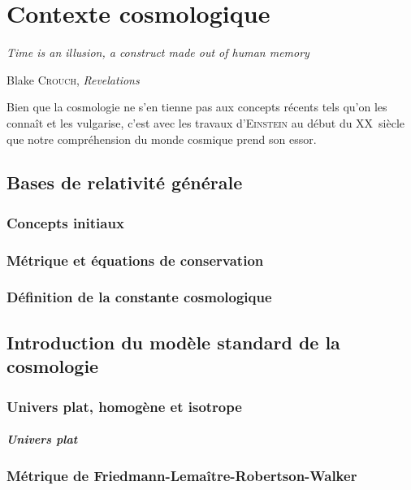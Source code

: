 \documentclass[../main/main.tex]{subfiles}
\begin{document}
\mainmatter


\chapter{Contexte cosmologique}\label{ch:cosmo}

\epigraph{\openquote\textit{Time is an illusion, a construct made out of human
memory}\closequote}{Blake \textsc{Crouch}, \textit{Revelations}}

Bien que la cosmologie ne s'en tienne pas aux concepts récents tels qu'on les
connaît et les vulgarise, c'est avec les travaux d'\textsc{Einstein} au début du
XX\ieme~siècle que notre compréhension du monde cosmique prend son essor. 

\vfill
\minitoc
\vfill

\newpage

\section{Bases de relativité générale}\label{sec:11}
\subsection{Concepts initiaux}\label{ssec:RG}
\subsection{Métrique et équations de conservation}\label{ssec:112}
\subsection{Définition de la constante cosmologique}\label{ssec:lambda}

\section{Introduction du modèle standard de la cosmologie}\label{sec:MS}
\subsection{Univers plat, homogène et isotrope}\label{ssec:plat}
\paragraph*{Univers plat}
\subsection{Métrique de Friedmann-Lemaître-Robertson-Walker}\label{ssec:FLRW}
\end{document}
